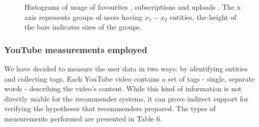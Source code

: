 \begin{figure}[htb]
  \centering
  \label{fig:subfigureExample}
  \caption{Histograms of usage of favourites , subscriptions
   and uploads . The x axis represents groups of
  users having $x_1-x_2$ entities, the height of the bars indicates sizes of the
  groups.}
\end{figure}

\subsubsection{YouTube measurements employed}

We have decided to measure the user data in two ways: by identifying entities
and collecting tags. Each YouTube video contains a set of tags - single,
separate words - describing the video's content. While this kind of information
is not directly usable for the recommender systems, it can prove indirect
support for verifying the hypotheses that recommenders prepared. The types of
measurements performed are presented in Table 6.

